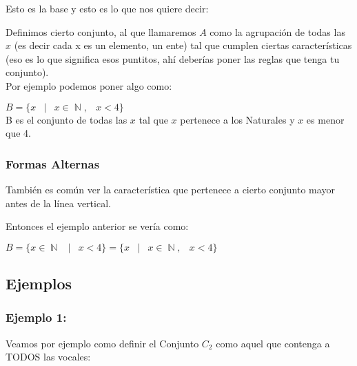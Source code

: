 \documentclass[12pt]{report}                                    %
\DeclareMathOperator \Space {\quad}                             %
\DeclareMathOperator \MiniSpace {\;}                            %
\newcommand \Such {\MiniSpace|\MiniSpace}                       %
\DeclareMathOperator \Naturals {\mathbb{N}}                     %
\begin{document}
                    Esto es la base y esto es lo que nos quiere decir:

                    Definimos cierto conjunto, al que llamaremos $A$ como la agrupación de todas las $x$
                    (es decir cada x es un elemento, un ente) tal que cumplen ciertas características
                    (eso es lo que significa esos puntitos, ahí deberías poner las reglas que tenga
                    tu conjunto). \\

                    Por ejemplo podemos poner algo como:

                    $B = \{ x \Such x \in \Naturals, \MiniSpace x < 4 \}$\\

                    B es el conjunto de todas las $x$ tal que $x$ pertenece a los Naturales
                    y $x$ es menor que 4.


                \subsubsection*{Formas Alternas}
                
                    También es común ver la característica que pertenece a cierto conjunto mayor
                    antes de la línea vertical.

                    Entonces el ejemplo anterior se vería como:

                    $B = \{ x \in \Naturals \Such x < 4 \} = \{ x \Such x \in \Naturals, \MiniSpace x < 4 \} $


                
            \clearpage
            \subsection{Ejemplos} 

            \subsubsection*{Ejemplo 1:}

                Veamos por ejemplo como definir el Conjunto $C_2$ como aquel que contenga a
                TODOS las vocales:
\end{document}

